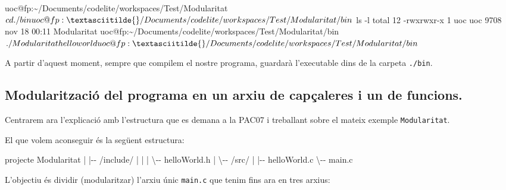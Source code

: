 \documentclass[
]{book}
\newenvironment{Shaded}{\begin{snugshade}}{\end{snugshade}}
\newcommand{\BaseNTok}[1]{\textcolor[rgb]{0.00,0.00,0.81}{#1}}
\newcommand{\DecValTok}[1]{\textcolor[rgb]{0.00,0.00,0.81}{#1}}
\newcommand{\NormalTok}[1]{#1}
\begin{document}
\begin{Shaded}
\begin{Highlighting}[]
\NormalTok{uoc@fp:\textasciitilde{}/Documents/codelite/workspaces/Test/Modularitat$ cd ./bin}
\NormalTok{uoc@fp:\textasciitilde{}/Documents/codelite/workspaces/Test/Modularitat/bin$ ls {-}l}
\NormalTok{total }\DecValTok{12}
\NormalTok{{-}rwxrwxr{-}x }\DecValTok{1}\NormalTok{ uoc uoc }\DecValTok{9708}\NormalTok{ nov }\DecValTok{18} \BaseNTok{00}\NormalTok{:}\DecValTok{11}\NormalTok{ Modularitat}
\NormalTok{uoc@fp:\textasciitilde{}/Documents/codelite/workspaces/Test/Modularitat/bin$ ./Modularitat }
\NormalTok{hello world}
\NormalTok{uoc@fp:\textasciitilde{}/Documents/codelite/workspaces/Test/Modularitat/bin$}
\end{Highlighting}
\end{Shaded}

A partir d'aquest moment, sempre que compilem el nostre programa, guardarà l'executable dins de la carpeta \texttt{./bin}.

\hypertarget{modularitzaciuxf3-del-programa-en-un-arxiu-de-capuxe7aleres-i-un-de-funcions.}{%
\subsection{Modularització del programa en un arxiu de capçaleres i un de funcions.}\label{modularitzaciuxf3-del-programa-en-un-arxiu-de-capuxe7aleres-i-un-de-funcions.}}

Centrarem ara l'explicació amb l'estructura que es demana a la PAC07 i treballant sobre el mateix exemple \texttt{Modularitat}.

El que volem aconseguir és la següent estructura:

\begin{Shaded}
\begin{Highlighting}[]
\NormalTok{projecte Modularitat}
\NormalTok{   |}
\NormalTok{   |{-}{-} /include/}
\NormalTok{   |     |}
\NormalTok{   |     \textbackslash{}{-}{-} helloWorld.h}
\NormalTok{   |}
\NormalTok{   \textbackslash{}{-}{-} /src/}
\NormalTok{         |}
\NormalTok{         |{-}{-} helloWorld.c}
\NormalTok{         \textbackslash{}{-}{-} main.c}
\end{Highlighting}
\end{Shaded}

L'objectiu és dividir (modularitzar) l'arxiu únic \texttt{main.c} que tenim fins ara en tres arxius:
\end{document}
